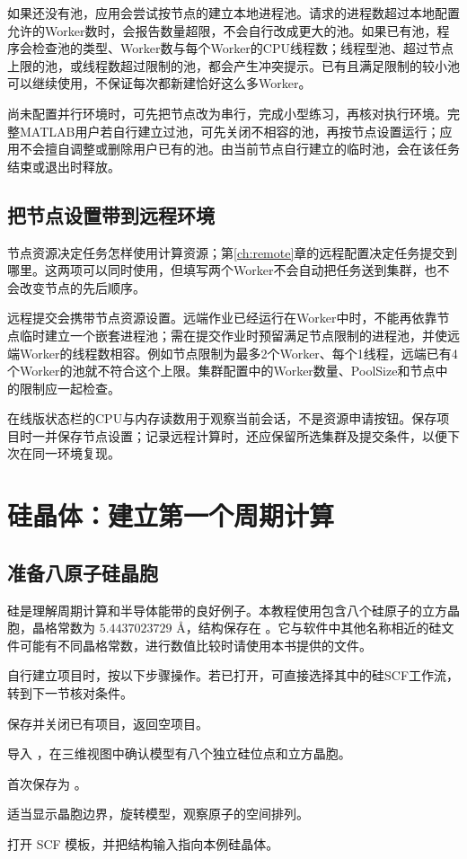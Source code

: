 如果还没有池，应用会尝试按节点的建立本地进程池。请求的进程数超过本地配置允许的Worker数时，会报告数量超限，不会自行改成更大的池。如果已有池，程序会检查池的类型、Worker数与每个Worker的CPU线程数；线程型池、超过节点上限的池，或线程数超过限制的池，都会产生冲突提示。已有且满足限制的较小池可以继续使用，不保证每次都新建恰好这么多Worker。

尚未配置并行环境时，可先把节点改为串行，完成小型练习，再核对执行环境。完整MATLAB\regmark{}用户若自行建立过池，可先关闭不相容的池，再按节点设置运行；应用不会擅自调整或删除用户已有的池。由当前节点自行建立的临时池，会在该任务结束或退出时释放。

\subsection{把节点设置带到远程环境}

节点资源决定任务怎样使用计算资源；第\ref{ch:remote}章的远程配置决定任务提交到哪里。这两项可以同时使用，但填写两个Worker不会自动把任务送到集群，也不会改变节点的先后顺序。

远程提交会携带节点资源设置。远端作业已经运行在Worker中时，不能再依靠节点临时建立一个嵌套进程池；需在提交作业时预留满足节点限制的进程池，并使远端Worker的线程数相容。例如节点限制为最多2个Worker、每个1线程，远端已有4个Worker的池就不符合这个上限。集群配置中的Worker数量、PoolSize和节点中的限制应一起检查。

在线版状态栏的CPU与内存读数用于观察当前会话，不是资源申请按钮。保存项目时一并保存节点设置；记录远程计算时，还应保留所选集群及提交条件，以便下次在同一环境复现。


\section{硅晶体：建立第一个周期计算}

\subsection{准备八原子硅晶胞}

硅是理解周期计算和半导体能带的良好例子。本教程使用包含八个硅原子的立方晶胞，晶格常数为 $5.4437023729$ Å，结构保存在 。它与软件中其他名称相近的硅文件可能有不同晶格常数，进行数值比较时请使用本书提供的文件。

自行建立项目时，按以下步骤操作。若已打开，可直接选择其中的硅SCF工作流，转到下一节核对条件。

\begin{steps}
\item 保存并关闭已有项目，返回空项目。
\item 导入 ，在三维视图中确认模型有八个独立硅位点和立方晶胞。
\item 首次保存为 。
\item 适当显示晶胞边界，旋转模型，观察原子的空间排列。
\item 打开 SCF 模板，并把结构输入指向本例硅晶体。
\end{steps}

